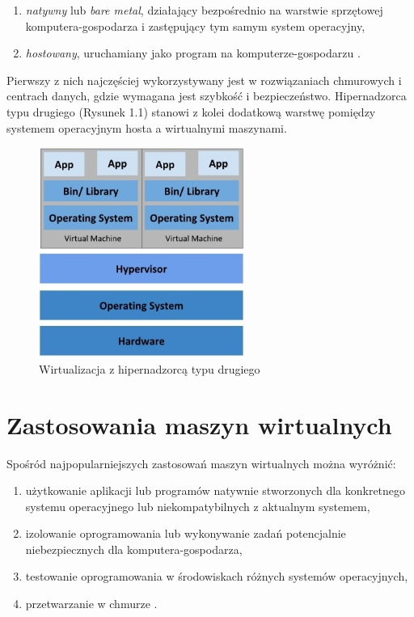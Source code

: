\begin{enumerate}[(1)]
    \item {\itshape natywny} lub {\itshape bare metal}, działający bezpośrednio na warstwie sprzętowej komputera-gospodarza i zastępujący tym samym system operacyjny, 
    
    \item {\itshape hostowany}, uruchamiany jako program na komputerze-gospodarzu \cite{biblia_linux}.
\end{enumerate}

Pierwszy z nich najczęściej wykorzystywany jest w rozwiązaniach chmurowych i centrach danych, gdzie wymagana jest szybkość i bezpieczeństwo. Hipernadzorca typu drugiego (Rysunek 1.1) stanowi z kolei dodatkową warstwę pomiędzy systemem operacyjnym hosta a wirtualnymi maszynami.

\begin{figure}[h]
    \centering
    \includegraphics[width=0.6\textwidth]{img/rozdzial1-1.jpg}
    \caption{Wirtualizacja z hipernadzorcą typu drugiego \cite{kubernetes}}
\end{figure}
\newpage

\section{Zastosowania maszyn wirtualnych}
Spośród najpopularniejszych zastosowań maszyn wirtualnych można wyróżnić:
\begin{enumerate}[(1)]
    \item użytkowanie aplikacji lub programów natywnie stworzonych dla konkretnego systemu operacyjnego lub niekompatybilnych z aktualnym systemem,
    \item izolowanie oprogramowania lub wykonywanie zadań potencjalnie niebezpiecznych dla komputera-gospodarza,
    \item testowanie oprogramowania w środowiskach różnych systemów operacyjnych,
    \item przetwarzanie w chmurze \cite{ibm}. 
\end{enumerate}

